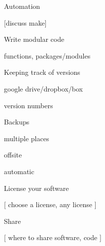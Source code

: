 \documentclass[aspectratio=169,12pt,t]{beamer}
\begin{document}
\begin{frame}[c]{Automation}

[discuss make]

\end{frame}




\begin{frame}[c]{Write modular code}

  functions, packages/modules

\end{frame}




\begin{frame}[c]{Keeping track of versions}

  google drive/dropbox/box

  version numbers



\end{frame}



\begin{frame}[c]{Backups}

  multiple places

  offsite

  automatic

\end{frame}






\begin{frame}[c]{License your software}

[ choose a license, any license ]


\end{frame}





\begin{frame}[c]{Share}

[ where to share software, code ]


\end{frame}
\end{document}
